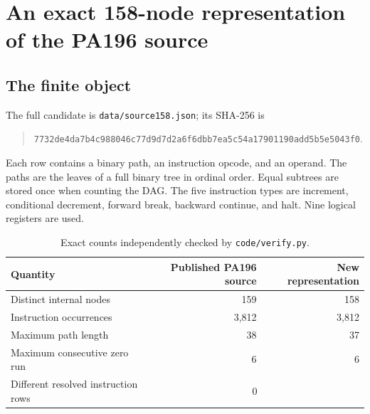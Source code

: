 \documentclass[11pt,letterpaper]{article}
\newcommand{\file}[1]{\texttt{\nolinkurl{#1}}}
\begin{document}
\section{An exact 158-node representation of the PA196 source}

\subsection{The finite object}

The full candidate is \file{data/source158.json}; its SHA-256 is
\begin{quote}\small
\nolinkurl{7732de4da7b4c988046c77d9d7d2a6f6dbb7ea5c54a17901190add5b5e5043f0}.
\end{quote}
Each row contains a binary path, an instruction opcode, and an operand.
The paths are the leaves of a full binary tree in ordinal order. Equal
subtrees are stored once when counting the DAG. The five instruction types
are increment, conditional decrement, forward break, backward continue,
and halt. Nine logical registers are used.

\begin{table}[ht]
\centering
\begin{tabular}{@{}lrr@{}}
\toprule
Quantity & Published PA196 source & New representation\\
\midrule
Distinct internal nodes &159&158\\
Instruction occurrences &3,812&3,812\\
Maximum path length &38&37\\
Maximum consecutive zero run &6&6\\
Different resolved instruction rows &\multicolumn{2}{c}{0}\\
\bottomrule
\end{tabular}
\caption{Exact counts independently checked by \file{code/verify.py}.}
\end{table}
\end{document}
